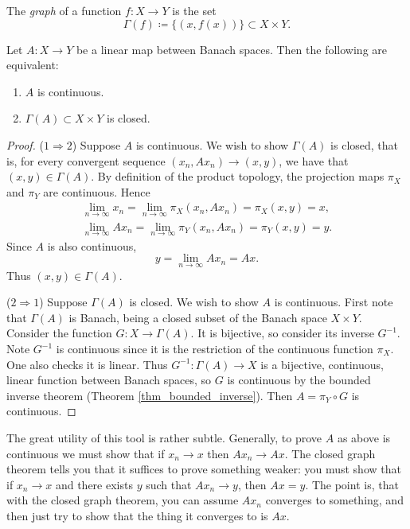 \documentclass[12pt]{article}
\begin{document}
\begin{refsection}
\begin{definition}
	The \emph{graph} of a function $f:X\to Y$ is the set 
	\begin{equation*}
		\Gamma(f) \coloneqq \{ (x, f(x)) \} \subset X\times Y.
	\end{equation*}
\end{definition}

\begin{theorem}
	Let $A:X\to Y$ be a linear map between Banach spaces. Then the following are equivalent:
	\begin{enumerate}
		\item $A$ is continuous.
		\item $\Gamma(A)\subset X\times Y$ is closed.
	\end{enumerate}
\end{theorem}
\begin{proof}
	($1\Rightarrow 2$) Suppose $A$ is continuous. We wish to show $\Gamma(A)$ is closed, that is, for every convergent sequence $(x_n, Ax_n)\to (x,y)$, we have that $(x,y)\in \Gamma(A)$. By definition of the product topology, the projection maps $\pi_X$ and $\pi_Y$ are continuous. Hence 
	\begin{gather*}
		\lim_{n\to\infty} x_n = \lim_{n\to\infty}\pi_X(x_n, Ax_n) = \pi_X(x,y) = x, \\
		\lim_{n\to\infty} Ax_n = \lim_{n\to\infty}\pi_Y(x_n, Ax_n) = \pi_Y(x,y) = y.
	\end{gather*}
	Since $A$ is also continuous, 
	\begin{equation*}
		y = \lim_{n\to\infty} Ax_n = Ax.
	\end{equation*}
	Thus $(x,y)\in\Gamma(A)$.

	($2\Rightarrow 1$) Suppose $\Gamma(A)$ is closed. We wish to show $A$ is continuous. First note that $\Gamma(A)$ is Banach, being a closed subset of the Banach space $X\times Y$. Consider the function $G: X\to \Gamma(A)$. It is bijective, so consider its inverse $G^{-1}$. Note $G^{-1}$ is continuous since it is the restriction of the continuous function $\pi_X$. One also checks it is linear. Thus $G^{-1}:\Gamma(A)\to X$ is a bijective, continuous, linear function between Banach spaces, so $G$ is continuous by the bounded inverse theorem (Theorem \ref{thm_bounded_inverse}). Then $A=\pi_Y\circ G$ is continuous. 
\end{proof}

\begin{remark}
	The great utility of this tool is rather subtle. Generally, to prove $A$ as above is continuous we must show that if $x_n\to x$ then $Ax_n\to Ax$. The closed graph theorem tells you that it suffices to prove something weaker: you must show that if $x_n\to x$ and there exists $y$ such that $Ax_n\to y$, then $Ax=y$. The point is, that with the closed graph theorem, you can assume $Ax_n$ converges to something, and then just try to show that the thing it converges to is $Ax$.
\end{remark}


\end{refsection}
\end{document}
